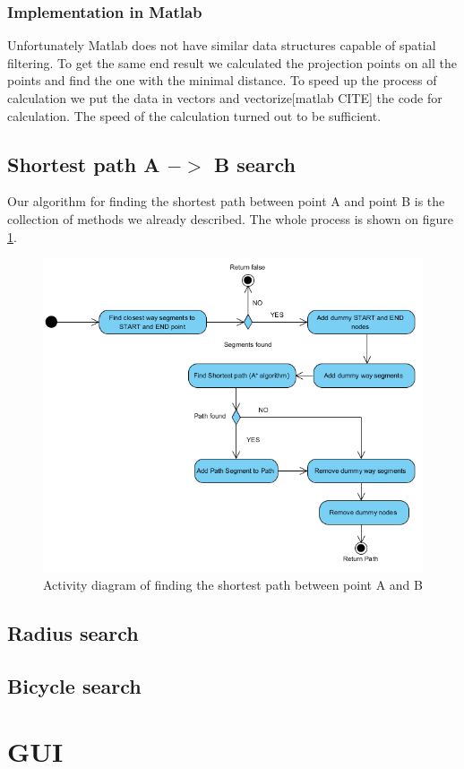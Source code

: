 \documentclass[reqno,openany,12pt]{amsbook}
\theoremstyle{definition}
\theoremstyle{remark}
\begin{document}
\subsection{Implementation in Matlab}
Unfortunately Matlab does not have similar data structures capable of spatial filtering. To get the same end result we calculated the projection points on all the points and find the one with the minimal distance. To speed up the process of calculation we put the data in vectors and vectorize[matlab CITE] the code for calculation. The speed of the calculation turned out to be sufficient.

\section{Shortest path A $->$ B search}
Our algorithm for finding the shortest path between point A and point B is the collection of methods we already described. The whole process is shown on figure \ref{fig:ab_activity}.
 \begin{figure}[h]
 \centering
 \includegraphics[width=0.7\linewidth]{../photos/shortest_path_ab_activity.png}
 \caption{Activity diagram of finding the shortest path between point A and B}
 \label{fig:ab_activity}
 \end{figure}

\section{Radius search}
\section{Bicycle search}
\chapter{GUI}
\end{document}
